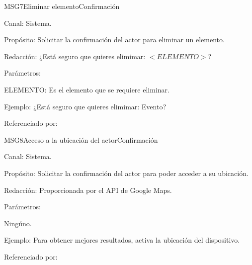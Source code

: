 \begin{mensaje}{MSG7}{Eliminar elemento}{Confirmación}
	\item[Canal:] Sistema.
    \item[Propósito:] Solicitar la confirmación del actor para eliminar un elemento.
    \item[Redacción:] ¿Está seguro que quieres elimimar: $<ELEMENTO>$?
    \item[Parámetros:] \item ELEMENTO: Es el elemento que se requiere eliminar.
    \item[Ejemplo:] ¿Está seguro que quieres elimimar: Evento?
	\item[Referenciado por: ] 
\end{mensaje}

\begin{mensaje}{MSG8}{Acceso a la ubicación del actor}{Confirmación}
	\item[Canal:] Sistema.
    \item[Propósito:] Solicitar la confirmación del actor para poder acceder a su ubicación.
    \item[Redacción:] Proporcionada por el API de Google Maps.
    \item[Parámetros:] \item Ningúno.
    \item[Ejemplo:] Para obtener mejores resultados, activa la ubicación del dispositivo.
	\item[Referenciado por: ] 
\end{mensaje}

